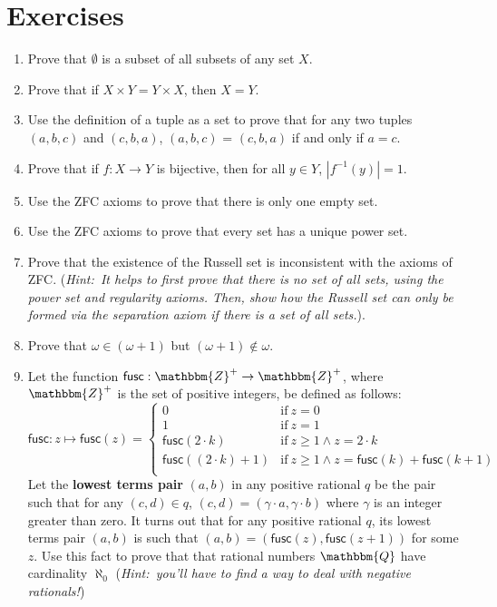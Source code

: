 \documentclass[11pt]{article}
\theoremstyle{definition}
\theoremstyle{remark}
\begin{document}
\section*{Exercises}
\begin{enumerate}
    \item Prove that $\emptyset$ is a subset of all subsets of any set $X$.

    \item Prove that if $X\times Y = Y\times X$, then $X=Y$.

    \item Use the definition of a tuple as a set to prove that for any two tuples $(a,b,c)$ and $(c,b,a)$, $(a,b,c)$ = $(c,b,a)$ if and only if $a=c$.

    \item Prove that if $f:X\rightarrow Y$ is bijective, then for all $y\in Y$, $|f^{-1}(y)|=1$. 

    \item Use the ZFC axioms to prove that there is only one empty set.

    \item Use the ZFC axioms to prove that every set has a unique power set.

    \item Prove that the existence of the Russell set is inconsistent with the axioms of ZFC. (\textit{Hint:\ It helps to first prove that there is no set of all sets, using the power set and regularity axioms. Then, show how the Russell set can only be formed via the separation axiom if there is a set of all sets.}).

    \item Prove that $\omega\in(\omega+1)$ but $(\omega + 1)\not\in\omega$. 

    \item Let the function $\textsf{fusc}:\mathbbm{Z}^{+}\rightarrow\mathbbm{Z}^{+}$, where $\mathbbm{Z}^{+}$ is the set of positive integers, be defined as follows:
    \begin{equation*}
    \textsf{fusc}:z\mapsto \textsf{fusc}(z) = \begin{cases}
        0 & \text{if} \ z=0\\
        1 & \text{if} \ z=1\\
        \textsf{fusc}(2\cdot k) & \text{if} \ z\geq 1 \wedge z=2\cdot k\\
        \textsf{fusc}((2\cdot k)+1) & \text{if} \ z\geq 1 \wedge z=\textsf{fusc}(k) + \textsf{fusc}(k+1)\\
    \end{cases}
    \end{equation*}
        Let the \textbf{lowest terms pair} $(a,b)$ in any positive rational $q$ be the pair such that for any $(c,d)\in q$, $(c,d)=(\gamma \cdot a,\gamma \cdot b)$ where $\gamma$ is an integer greater than zero. It turns out that for any positive rational $q$, its lowest terms pair $(a,b)$ is such that $(a,b)=(\textsf{fusc}(z),\textsf{fusc}(z+1))$ for some $z$. Use this fact to prove that that rational numbers $\mathbbm{Q}$ have cardinality $\aleph_{0}$ (\textit{Hint:\ you'll have to find a way to deal with negative rationals!})
\end{enumerate}
\end{document}
